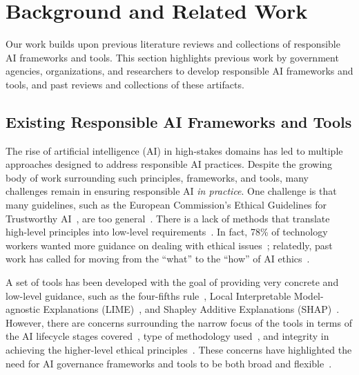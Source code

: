 \section{Background and Related Work}

Our work builds upon previous literature reviews and collections of responsible AI frameworks and tools. This section highlights previous work by government agencies, organizations, and researchers to develop responsible AI frameworks and tools, and past reviews and collections of these artifacts.

\subsection{Existing Responsible AI Frameworks and Tools}

The rise of artificial intelligence (AI) in high-stakes domains has led to multiple approaches designed to address responsible AI practices.
Despite the growing body of work surrounding such principles, frameworks, and tools, many challenges remain in ensuring responsible AI \emph{in practice}. 
One challenge is that many guidelines, such as the European Commission's Ethical Guidelines for Trustworthy AI~\cite{highlevel2019ethics}, are too general~\cite{floridi2021establishing}.
There is a lack of methods that translate high-level principles into low-level requirements~\cite{mittelstadt2019ai}.
In fact, 78\% of technology workers wanted more guidance on dealing with ethical issues~\cite{doteveryone2019people}; relatedly, past work has called for moving from the ``what'' to the ``how'' of AI ethics~\cite{Morley2019}.

A set of tools has been developed with the goal of providing very concrete and low-level guidance, such as the four-fifths rule~\cite{us2023select}, Local Interpretable Model-agnostic Explanations (LIME)~\cite{lime}, and Shapley Additive Explanations (SHAP)~\cite{lundberg2017unified}.
However, there are concerns surrounding the narrow focus of the tools in terms of the AI lifecycle stages covered~\cite{Kaye2023, Ojewale2024}, type of methodology used~\cite{Ojewale2024}, and integrity in achieving the higher-level ethical principles~\cite{Ojewale2024}.
These concerns have highlighted the need for AI governance frameworks and tools to be both broad and flexible~\cite{Ojewale2024, schiff2020principles}.

